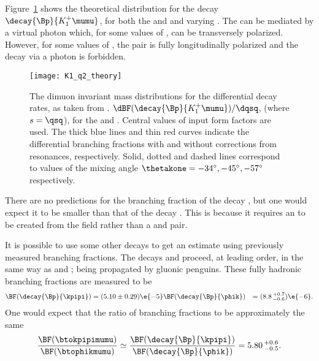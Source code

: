 Figure~\ref{fig:th:thetak1} shows the theoretical \qsq distribution for the decay
$\decay{\Bp}{K_1^+\mumu}$, for both the  and  and varying \thetakone.
The  can be mediated by a virtual photon which, for some values of \thetakone, can
be transversely polarized.
However, for some values of \thetakone, the \mumu pair is fully longitudinally polarized and the
decay via a photon is forbidden.

\begin{figure}
  \begin{center}
    \texttt{[image: K1\_q2\_theory]}
    \caption[Theoretical \qsq distribution for $\decay{\Bp}{K_1^+\mumu}$]
    {
      The dimuon invariant mass distributions for the differential decay rates, as taken from
      .
      $\dBF(\decay{\Bp}{K_1^+\mumu})/\dqsq$, (where $s=\qsq$), for the  and .
      Central values of input form factors are used.
      The thick blue lines and thin red curves indicate the differential branching fractions with
      and without corrections from resonances, respectively.
      Solid, dotted and dashed lines correspond to values of the mixing angle
      $\thetakone=-34^\circ,-45^\circ,-57^\circ$ respectively.
    }
    \label{fig:th:thetak1}
  \end{center}
\end{figure}

There are no predictions for the branching fraction of the decay \btophikmumu,
but one would expect it to be smaller than that of the decay \btokpipimumu.
This is because it requires an \ssbar to be created from the \QCD field rather than a \uubar and
\ddbar pair.

It is possible to use some other decays to get an estimate using previously measured branching
fractions.
The decays \decay{\Bp}{\kpipi} and \decay{\Bp}{\phik} proceed, at leading order, in the same way as
\btokpipimumu and \btophikmumu; being propagated by gluonic penguins.
These fully hadronic branching fractions are measured to be
\begin{align*}
  \BF(\decay{\Bp}{\kpipi}) &= (5.10\pm0.29)\e{-5}
  \BF(\decay{\Bp}{\phik}) &= (8.8\,^{+0.7}_{-0.6})\e{-6}.
\end{align*}
One would expect that the ratio of branching fractions to be approximately the same
\begin{equation}
  \frac{\BF(\btokpipimumu)}{\BF(\btophikmumu)}
  \simeq
  \frac{\BF(\decay{\Bp}{\kpipi})}{\BF(\decay{\Bp}{\phik})}
  =
  5.80\,^{+0.6}_{-0.5}.
\end{equation}


